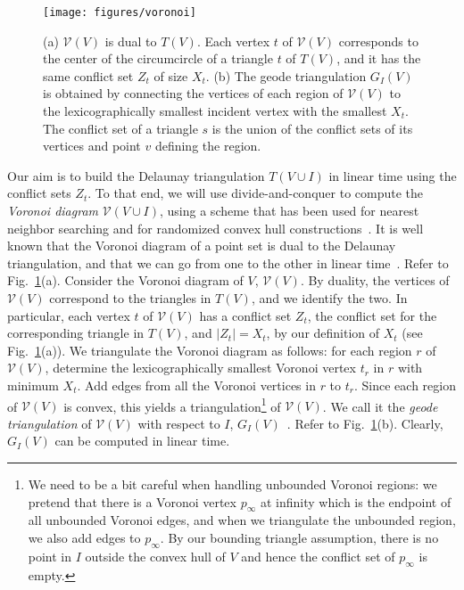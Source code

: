 \documentclass{siamltex}
\newcommand{\cV}{\mathcal{V}}
\begin{document}
\begin{figure}
\begin{center}
\texttt{[image: figures/voronoi]}
\end{center}
\caption{(a) $\cV(V)$ is dual to $T(V)$. Each vertex $t$ of $\cV(V)$ 
corresponds to the center of the circumcircle of a triangle $t$ of $T(V)$,
and it has the same conflict set $Z_t$ of size $X_t$. 
(b) The geode triangulation
$G_I(V)$ is obtained by connecting the vertices of each region of $\cV(V)$ to
the lexicographically smallest incident vertex with the smallest $X_t$. 
The conflict set of
a triangle $s$ is the union of the conflict sets of its vertices and
point $v$ defining the region.} \label{fig:vor}
\end{figure}
Our aim is to build the Delaunay triangulation
$T(V \cup I)$ in linear time using the conflict sets $Z_t$. To that end,
we will use divide-and-conquer to compute the \emph{Voronoi diagram}
$\cV(V \cup I)$,
using a scheme that has been used for nearest neighbor searching \cite{C88}
and for randomized convex hull constructions~\cite{CS89,Chazelle00}.
It is well
known that the Voronoi diagram of a point set is dual to the Delaunay 
triangulation,
and that we can go from one to the other in linear 
time~\cite[Chapter~9]{deBergKrOvSc00}.
Refer to Fig.~\ref{fig:vor}(a).
Consider the Voronoi diagram of $V$, $\cV(V)$.
By duality, the vertices of $\cV(V)$ correspond to the triangles
in $T(V)$, and we identify the two. In particular, each vertex $t$ of 
$\cV(V)$ has a conflict set $Z_t$, the conflict set for the 
corresponding triangle in $T(V)$, and $|Z_t| = X_t$, by our definition 
of $X_t$ (see Fig.~\ref{fig:vor}(a)).
We triangulate the Voronoi diagram as follows: for each region $r$ of
$\cV(V)$, determine the lexicographically smallest Voronoi vertex 
$t_r$ in $r$ with minimum $X_t$. Add edges from  all the Voronoi vertices 
in $r$ to $t_r$. Since each region of $\cV(V)$ is convex, this 
yields a triangulation\footnote{We need to be a bit careful when handling 
unbounded 
Voronoi regions:
we pretend that there is a Voronoi vertex $p_\infty$ at infinity which is the 
endpoint of all unbounded Voronoi edges, and when we triangulate the 
unbounded region, we also add
edges to $p_\infty$. By our bounding triangle assumption, there is no point in 
$I$ outside the convex hull of $V$ and hence the conflict set 
of $p_\infty$ is empty.} of $\cV(V)$. We call it the 
\emph{geode triangulation} of $\cV(V)$ with respect to $I$, 
$G_I(V)$~\cite{C88,Chazelle00}. Refer to Fig.~\ref{fig:vor}(b).
Clearly, $G_I(V)$ can be computed in linear time. 
\end{document}
